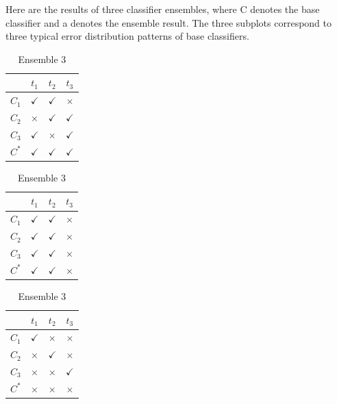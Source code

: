 \documentclass[12pt,letterpaper, onecolumn]{exam}
\begin{document}
\begin{questions}
    \newpage
    \question Here are the results of three classifier ensembles, where C denotes the base classifier and a denotes the ensemble result. The three subplots correspond to three typical error distribution patterns of base classifiers.
        \begin{table}[!h]
        \centering
        \begin{minipage}{0.32\textwidth}
        \centering
        \caption{Ensemble 1}
        \begin{tabular}{c|ccc}
        \hline
         & $t_1$ & $t_2$ & $t_3$ \\
        \hline
        $C_1$ & $\checkmark$ & $\checkmark$ & $\times$ \\
        $C_2$ & $\times$ & $\checkmark$ & $\checkmark$ \\
        $C_3$ & $\checkmark$ & $\times$ & $\checkmark$ \\
        $C^*$ & $\checkmark$ & $\checkmark$ & $\checkmark$ \\
        \hline
        \end{tabular}
        \end{minipage}
        \hfill
        \begin{minipage}{0.32\textwidth}
        \centering
        \caption{Ensemble 2}
        \begin{tabular}{c|ccc}
        \hline
         & $t_1$ & $t_2$ & $t_3$ \\
        \hline
        $C_1$ & $\checkmark$ & $\checkmark$ & $\times$ \\
        $C_2$ & $\checkmark$ & $\checkmark$ & $\times$ \\
        $C_3$ & $\checkmark$ & $\checkmark$ & $\times$ \\
        $C^*$ & $\checkmark$ & $\checkmark$ & $\times$ \\
        \hline
        \end{tabular}
        \end{minipage}
        \hfill
        \begin{minipage}{0.32\textwidth}
        \centering
        \caption{Ensemble 3}
        \begin{tabular}{c|ccc}
        \hline
         & $t_1$ & $t_2$ & $t_3$ \\
        \hline
        $C_1$ & $\checkmark$ & $\times$ & $\times$ \\
        $C_2$ & $\times$ & $\checkmark$ & $\times$ \\
        $C_3$ & $\times$ & $\times$ & $\checkmark$ \\
        $C^*$ & $\times$ & $\times$ & $\times$ \\
        \hline
        \end{tabular}
        \end{minipage}
        \end{table}


\end{questions}
\end{document}
